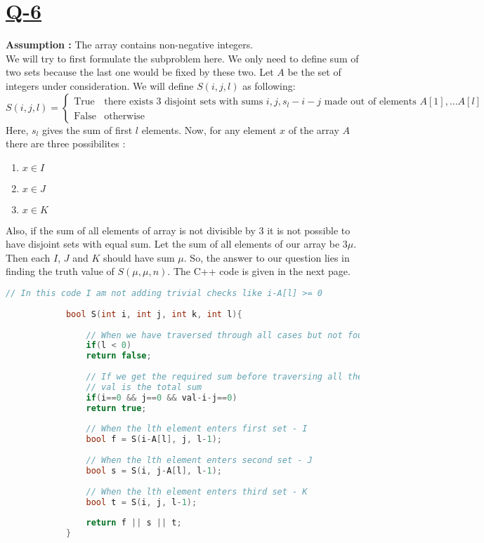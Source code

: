 \documentclass[14pt]{article}
\begin{document}
	\section*{\underline{Q-6}}
		\noindent
		\textbf{Assumption : }The array contains non-negative integers.\\
		We will try to first formulate the subproblem here. We only need to define sum of two sets because the last one would be fixed by these two. Let $A$ be the set of integers under consideration. We will define $S(i, j, l)$ as following:
		\[
		S(i, j, l) = \begin{cases}
			\text{True} & \text{there exists 3 disjoint sets with sums }i, j, s_l - i - j \text{ made out of elements }A[1], \dots A[l]  \\
			\text{False} & \text{otherwise}
		\end{cases}
		\]
		Here, $s_l$ gives the sum of first $l$ elements. Now, for any element $x$ of the array $A$ there are three possibilites : 
		\begin{enumerate}
			\item $x \in I$
			\item $x \in J$
			\item $x \in K$
		\end{enumerate} 
		Also, if the sum of all elements of array is not divisible by 3 it is not possible to have disjoint sets with equal sum. Let the sum of all elements of our array be $3\mu$. Then each $I$, $J$ and $K$ should have sum $\mu$. So, the answer to our question lies in finding the truth value of $S(\mu, \mu, n)$. The C++ code is given in the next page. \\
		\begin{lstlisting}[language=C++]
			// In this code I am not adding trivial checks like i-A[l] >= 0
			
			bool S(int i, int j, int k, int l){
				
				// When we have traversed through all cases but not found a single match
				if(l < 0)
				return false;
				
				// If we get the required sum before traversing all the cases we output true
				// val is the total sum
				if(i==0 && j==0 && val-i-j==0)
				return true;
				
				// When the lth element enters first set - I
				bool f = S(i-A[l], j, l-1);
				
				// When the lth element enters second set - J
				bool s = S(i, j-A[l], l-1);
				
				// When the lth element enters third set - K
				bool t = S(i, j, l-1);
				
				return f || s || t;
			}
		\end{lstlisting}
\end{document}
